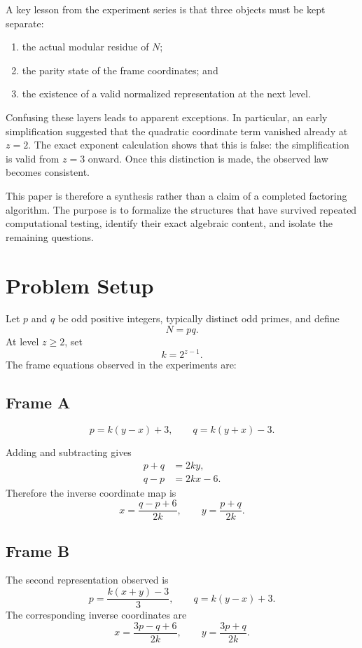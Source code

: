 \documentclass[11pt,a4paper]{article}
\theoremstyle{definition}
\theoremstyle{remark}
\begin{document}
A key lesson from the experiment series is that three objects must be kept separate:
\begin{enumerate}[label=(\roman*)]
  \item the actual modular residue of $N$;
  \item the parity state of the frame coordinates; and
  \item the existence of a valid normalized representation at the next level.
\end{enumerate}

Confusing these layers leads to apparent exceptions. In particular, an early simplification suggested that the quadratic coordinate term vanished already at $z=2$. The exact exponent calculation shows that this is false: the simplification is valid from $z=3$ onward. Once this distinction is made, the observed law becomes consistent.

This paper is therefore a synthesis rather than a claim of a completed factoring algorithm. The purpose is to formalize the structures that have survived repeated computational testing, identify their exact algebraic content, and isolate the remaining questions.

\section{Problem Setup}

Let $p$ and $q$ be odd positive integers, typically distinct odd primes, and define
\[
N=pq.
\]
At level $z\ge2$, set
\[
k=2^{z-1}.
\]
The frame equations observed in the experiments are:

\subsection{Frame A}
\begin{equation}
 p=k(y-x)+3,
 \qquad
 q=k(y+x)-3.
 \label{eq:frameA}
\end{equation}

Adding and subtracting gives
\begin{align}
 p+q &=2ky,
 \\ q-p &=2kx-6.
\end{align}
Therefore the inverse coordinate map is
\begin{equation}
 x=\frac{q-p+6}{2k},
 \qquad
 y=\frac{p+q}{2k}.
 \label{eq:Ainverse}
\end{equation}

\subsection{Frame B}
The second representation observed is
\begin{equation}
 p=\frac{k(x+y)-3}{3},
 \qquad
 q=k(y-x)+3.
 \label{eq:frameB}
\end{equation}
The corresponding inverse coordinates are
\begin{equation}
 x=\frac{3p-q+6}{2k},
 \qquad
 y=\frac{3p+q}{2k}.
 \label{eq:Binverse}
\end{equation}
\end{document}
